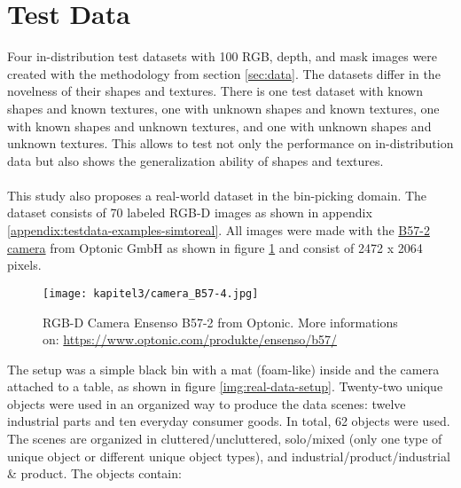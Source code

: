 	\section{Test Data}
	\label{sec:test-data}
		Four in-distribution test datasets with 100 RGB, depth, and mask images were created with the methodology from section \ref{sec:data}.
		The datasets differ in the novelness of their shapes and textures. There is one test dataset with known shapes and known textures, one with unknown shapes and known textures, one with known shapes and unknown textures, and one with unknown shapes and unknown textures. This allows to test not only the performance on in-distribution data but also shows the generalization ability of shapes and textures.\\
		\\
		This study also proposes a real-world dataset in the bin-picking domain. The dataset consists of 70 labeled RGB-D images as shown in appendix \ref{appendix:testdata-examples-simtoreal}. All images were made with the \href{https://www.optonic.com/produkte/ensenso/b57/}{B57-2 camera} from Optonic GmbH \cite{optonic} as shown in figure \ref{img:camera} and consist of 2472 x 2064 pixels.
		\begin{figure}[h]
			\centering
			\texttt{[image: kapitel3/camera\_B57-4.jpg]}
			\caption[RGB-D Camera Ensenso B57-2 from Optonic. More informations on: \url{https://www.optonic.com/produkte/ensenso/b57/}]{RGB-D Camera Ensenso B57-2 from Optonic. More informations on: \url{https://www.optonic.com/produkte/ensenso/b57/}}
			\label{img:camera}
		\end{figure}
		\FloatBarrier
		The setup was a simple black bin with a mat (foam-like) inside and the camera attached to a table, as shown in figure \ref{img:real-data-setup}.
		Twenty-two unique objects were used in an organized way to produce the data scenes: twelve industrial parts and ten everyday consumer goods. In total, 62 objects were used. The scenes are organized in cluttered/uncluttered, solo/mixed (only one type of unique object or different unique object types), and industrial/product/industrial \& product.
		\clearpage
		The objects contain:

